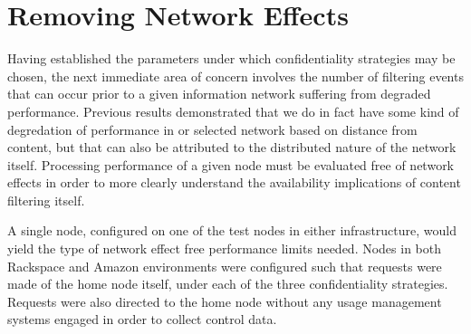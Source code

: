 \section{Removing Network Effects}
Having established the parameters under which confidentiality strategies may be chosen, the next immediate area of concern involves the number of filtering events that can occur prior to a given information network suffering from degraded performance.  Previous results demonstrated that we do in fact have some kind of degredation of performance in or selected network based on distance from content, but that can also be attributed to the distributed nature of the network itself.  Processing performance of a given node must be evaluated free of network effects in order to more clearly understand the availability implications of content filtering itself.

A single node, configured on one of the test nodes in either infrastructure, would yield the type of network effect free performance limits needed.  Nodes in both Rackspace and Amazon environments were configured such that requests were made of the home node itself, under each of the three confidentiality strategies.  Requests were also directed to the home node without any usage management systems engaged in order to collect control data.